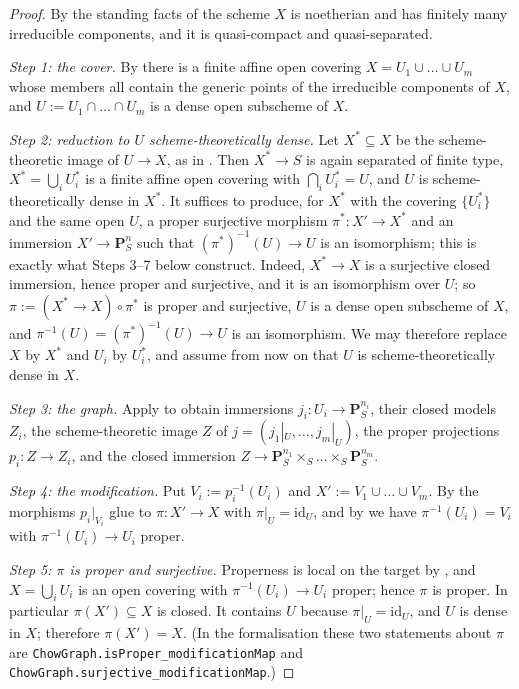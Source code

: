 \begin{proof}
\leanok
By the standing facts of  the scheme $X$ is
noetherian and has finitely many irreducible components, and it is
quasi-compact and quasi-separated.

\emph{Step 1: the cover.}  By  there is a finite
affine open covering $X=U_1\cup\dots\cup U_m$ whose members all contain the
generic points of the irreducible components of $X$, and
$U:=U_1\cap\dots\cap U_m$ is a dense open subscheme of $X$.

\emph{Step 2: reduction to $U$ scheme-theoretically dense.}  Let
$X^{*}\subseteq X$ be the scheme-theoretic image of $U\to X$, as in
.  Then $X^{*}\to S$ is again separated
of finite type, $X^{*}=\bigcup_iU_i^{*}$ is a finite affine open covering with
$\bigcap_iU_i^{*}=U$, and $U$ is scheme-theoretically dense in $X^{*}$.
It suffices to produce, for $X^{*}$ with the covering $\{U_i^{*}\}$ and the
same open $U$, a proper surjective morphism $\pi^{*}\colon X'\to X^{*}$ and an
immersion $X'\to\mathbf P^n_S$ such that $(\pi^{*})^{-1}(U)\to U$ is an
isomorphism; this is exactly what Steps 3--7 below construct.  Indeed,
$X^{*}\to X$ is a surjective closed immersion, hence proper and surjective, and
it is an isomorphism over $U$; so $\pi:=(X^{*}\to X)\circ\pi^{*}$ is proper and
surjective, $U$ is a dense open subscheme of $X$, and
$\pi^{-1}(U)=(\pi^{*})^{-1}(U)\to U$ is an isomorphism.  We may therefore
replace $X$ by $X^{*}$ and $U_i$ by $U_i^{*}$, and assume from now on that $U$
is scheme-theoretically dense in $X$.

\emph{Step 3: the graph.}  Apply  to obtain immersions
$j_i\colon U_i\to\mathbf P^{n_i}_S$, their closed models $Z_i$, the
scheme-theoretic image $Z$ of $j=(j_1|_U,\dots,j_m|_U)$, the proper
projections $p_i\colon Z\to Z_i$, and the closed immersion
$Z\to\mathbf P^{n_1}_S\times_S\dots\times_S\mathbf P^{n_m}_S$.

\emph{Step 4: the modification.}  Put $V_i:=p_i^{-1}(U_i)$ and
$X':=V_1\cup\dots\cup V_m$.  By  the morphisms
$p_i|_{V_i}$ glue to $\pi\colon X'\to X$ with $\pi|_U=\mathrm{id}_U$, and by
 we have $\pi^{-1}(U_i)=V_i$ with
$\pi^{-1}(U_i)\to U_i$ proper.

\emph{Step 5: $\pi$ is proper and surjective.}  Properness is local on the
target by , and $X=\bigcup_iU_i$ is an open covering with
$\pi^{-1}(U_i)\to U_i$ proper; hence $\pi$ is proper.  In particular
$\pi(X')\subseteq X$ is closed.  It contains $U$ because
$\pi|_U=\mathrm{id}_U$, and $U$ is dense in $X$; therefore $\pi(X')=X$.
(In the formalisation these two statements about $\pi$ are
\texttt{ChowGraph.isProper\_modificationMap} and
\texttt{ChowGraph.surjective\_modificationMap}.)


\end{proof}
